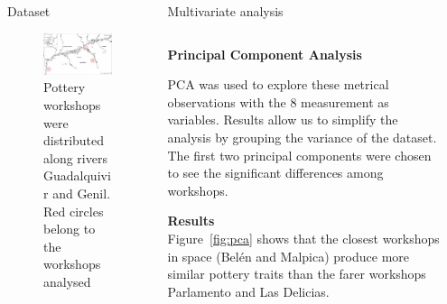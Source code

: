 \documentclass[final]{beamer}
\newlength{\sepwid}
\newlength{\onecolwid}
\newlength{\twocolwid}
\begin{document}
\begin{frame}[t]
\begin{columns}[t]
\begin{column}{\onecolwid}
\begin{block}{Dataset}
\begin{figure}
\includegraphics[width=0.7\linewidth]{images/fig1.png}
\caption{Pottery workshops were distributed along rivers Guadalquivir and Genil. Red circles belong to the workshops analysed}
\label{fig:betica}
\end{figure}


 \end{block}
\end{column} %

\begin{column}{\twocolwid}


\begin{block}{Multivariate analysis}
\begin{columns}[t,totalwidth=\twocolwid]



\begin{column}{\onecolwid} %


{\textbf{Principal Component Analysis}} 
\justify

PCA was used to explore these metrical observations with the 8 measurement as variables. Results allow us to simplify the analysis by grouping the variance of the dataset. The first two principal components were chosen to see the significant differences among workshops. 

\vspace{1cm}
{\textbf{Results}}\\
\justify
Figure~\ref{fig:pca} shows that the closest workshops in space (Bel\'en and Malpica) produce more similar pottery traits than the farer workshops Parlamento and Las Delicias.


\end{column}

\begin{column}{\sepwid}\end{column} %


\end{columns}
\end{block}
\end{column}
\end{columns}
\end{frame}
\end{document}
